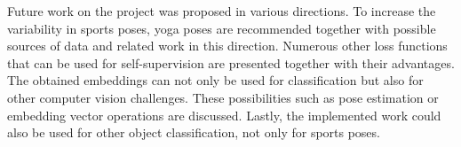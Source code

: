 Future work on the project was proposed in various directions. To increase the variability in sports poses, yoga poses are recommended together with possible sources of data and related work in this direction. Numerous other loss functions that can be used for self-supervision are presented together with their advantages. The obtained embeddings can not only be used for classification but also for other computer vision challenges. These possibilities such as pose estimation or embedding vector operations are discussed. Lastly, the implemented work could also be used for other object classification, not only for sports poses. 
